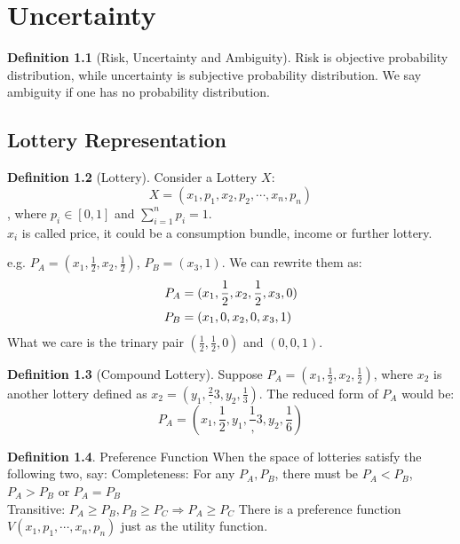 \documentclass{book}
\theoremstyle{plain}
\theoremstyle{definition}
\newtheorem{defn}{Definition}[section]
\theoremstyle{remark}
\begin{document}
\chapter{Uncertainty}
\begin{defn}[Risk, Uncertainty and Ambiguity]
Risk is objective probability distribution, while uncertainty is subjective probability distribution. We say ambiguity if one has no probability distribution.
\end{defn}

\section{Lottery Representation}
\begin{defn}[Lottery]
Consider a Lottery $X$:
\begin{equation}
	X = (x_1, p_1, x_2, p_2, \cdots, x_n, p_n)
\end{equation}
, where $p_i \in [0,1]$ and $\sum^n_{i=1}p_i=1$.\\
$x_i$ is called price, it could be a consumption bundle, income or further lottery.
\end{defn}
e.g. $P_A = (x_1,\frac{1}{2}, x_2, \frac{1}{2})$, $P_B =(x_3,1)$. We can rewrite them as:
\begin{align} \notag
P_A &= (x_1,\frac{1}{2}, x_2, \frac{1}{2}, x_3, 0) \\ \notag
P_B &= (x_1,0, x_2, 0, x_3, 1)
\end{align}
What we care is the trinary pair $(\frac{1}{2},\frac{1}{2},0)$ and $(0,0,1)$.
\begin{defn}[Compound Lottery]
Suppose $P_A = (x_1,\frac{1}{2}, x_2, \frac{1}{2})$, where $x_2$ is another lottery defined as $x_2=( y_1, \frac{2},{3}, y_2,\frac{1}{3})$. The reduced form of $P_A$ would be:
	\begin{equation}
		P_A=(x_1, \frac{1}{2}, y_1, \frac{1},{3}, y_2,\frac{1}{6})
	\end{equation}
\end{defn}

\begin{defn}{Preference Function}
When the space of lotteries satisfy the following two, say:
Completeness: For any $P_A, P_B$, there must be $P_A< P_B$, $P_A>P_B$ or $P_A= P_B$\\
Transitive: $P_A \geq P_B, P_B \geq P_C \Rightarrow P_A \geq P_C$
There is a preference function $V(x_1, p_1, \cdots,x_n, p_n)$ just as the utility function.
\end{defn}
\end{document}
